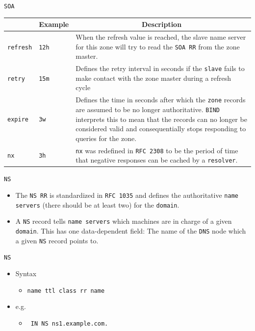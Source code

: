 \documentclass[xcolor=table]{beamer}
\begin{document}
\begin{frame}{\texttt{SOA}}
  \begin{table}
    \tiny
    \begin{tabular}{|p{1.6cm}|p{1.6cm}|p{4.7cm}|} 
      \hline
      \rowcolor{gray}
      \multicolumn{1}{|c|}{Syntax} & \multicolumn{1}{c|}{Example} & \multicolumn{1}{c|}{Description}\\ 
      \hline
      \texttt{refresh}&\texttt{12h}&When the refresh value is reached, the slave name server for this zone will try to read the \texttt{SOA RR} from the zone master.\\
      \hline
      \texttt{retry}&\texttt{15m}&Defines the retry interval in seconds if the \texttt{slave} fails to make contact with the zone master during a refresh cycle\\
      \hline
      \texttt{expire}&\texttt{3w}&Defines the time in seconds after which the \texttt{zone} records are assumed to be no longer authoritative. \texttt{BIND} interprets this to mean that the records can no longer be considered valid and consequentially stops responding to queries for the zone.\\
      \hline
      \texttt{nx}&\texttt{3h}&\texttt{nx} was redefined in \texttt{RFC 2308} to be the period of time that negative responses can be cached by a \texttt{resolver}.\\
      \hline
    \end{tabular}
  \end{table}
\end{frame}

\begin{frame}{\texttt{NS}}
  \begin{itemize}
      \item The \texttt{NS RR} is standardized in \texttt{RFC 1035} and defines the authoritative \texttt{name servers} (there should be at least two) for the \texttt{domain}.
      \item A \texttt{NS} record tells \texttt{name servers} which machines are in charge of a given \texttt{domain}. This has one data-dependent field: The name of the \texttt{DNS} node which a given \texttt{NS} record points to. 
  \end{itemize}
\end{frame}

\begin{frame}{\texttt{NS}}
  \begin{itemize}
    \item Syntax
      \begin{itemize}
        \item \texttt{name ttl class rr name}
      \end{itemize}
    \item e.g.
      \begin{itemize}
        \item \texttt{ IN NS ns1.example.com.}
      \end{itemize}
  \end{itemize}
\end{frame}
\end{document}
